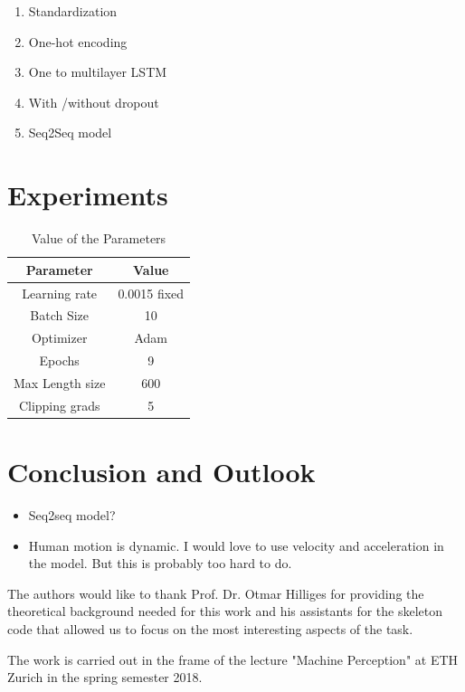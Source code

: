 \begin{enumerate}
 	\item Standardization
 	\item One-hot encoding
 	\item One to multilayer LSTM
 	\item With /without dropout
 	\item Seq2Seq model
 \end{enumerate}

\section{Experiments}

\begin{table}[]
	\centering
	\caption{Value of the Parameters }
	\label{my-label}
	\begin{tabular}{cc}
			Parameter& Value \\
		\hline
     	\hline
		Learning rate  &  0.0015 fixed    \\
		Batch Size  & 10 \\
		Optimizer  & Adam  \\
		Epochs  & 9 \\
		Max Length size  &  600 \\
		Clipping grads &  5\\
		\hline
	\end{tabular}
\end{table}

\section{Conclusion and Outlook}
\begin{itemize}
	\item Seq2seq model?
	\item Human motion is dynamic. I would love to use velocity and acceleration in the model. But this is probably too hard to do.
\end{itemize}

\begin{acks}
	The authors would like to thank Prof. Dr. Otmar Hilliges for providing the theoretical background needed for this work and his assistants for the skeleton code that allowed us to focus on the most interesting aspects of the task.
	
	The work is carried out in the frame of the lecture "Machine Perception" at ETH Zurich in the spring semester 2018.
	
\end{acks}


